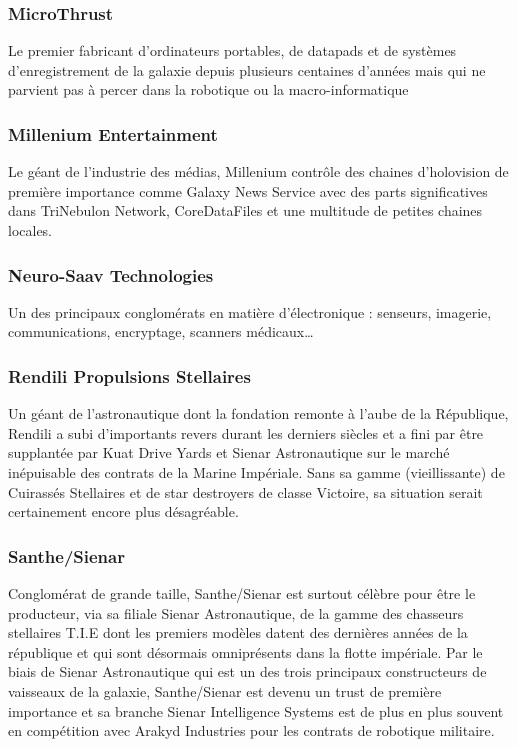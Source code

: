 \documentclass[twoside]{article}
\begin{document}
\subsubsection{MicroThrust}
Le premier fabricant d'ordinateurs portables, de datapads et de systèmes d'enregistrement de la galaxie depuis plusieurs centaines d'années mais qui ne parvient pas à percer dans la robotique ou la macro-informatique

\subsubsection{Millenium Entertainment}
Le géant de l’industrie des médias, Millenium contrôle des chaines d’holovision de première importance comme Galaxy News Service avec des parts significatives dans TriNebulon Network, CoreDataFiles et une multitude de petites chaines locales.  

\subsubsection{Neuro-Saav Technologies}
Un des principaux conglomérats en matière d'électronique : senseurs, imagerie, communications, encryptage, scanners médicaux\ldots

\subsubsection{Rendili Propulsions Stellaires}
Un géant de l'astronautique dont la fondation remonte à l'aube de la République, Rendili a subi d'importants revers durant les derniers siècles et a fini par être supplantée par Kuat Drive Yards et Sienar Astronautique sur le marché inépuisable des contrats de la Marine Impériale. Sans sa gamme (vieillissante) de Cuirassés Stellaires et de star destroyers de classe Victoire, sa situation serait certainement encore plus désagréable.

\subsubsection{Santhe/Sienar}
Conglomérat de grande taille, Santhe/Sienar est surtout célèbre pour être le producteur, via sa filiale Sienar Astronautique, de la gamme des chasseurs stellaires T.I.E dont les premiers modèles datent des dernières années de la république et qui sont désormais omniprésents dans la flotte impériale. Par le biais de Sienar Astronautique qui est un des trois principaux constructeurs de vaisseaux de la galaxie, Santhe/Sienar est devenu un trust de première importance et sa branche Sienar Intelligence Systems est de plus en plus souvent en compétition avec Arakyd Industries pour les contrats de robotique militaire.
\end{document}
